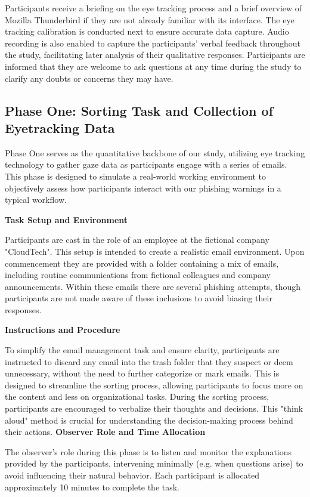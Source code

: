 \documentclass[
  a4paper,  %
  twoside,  %
  bibliography=totoc,
  headsepline,
  cleardoublepage=empty,
  parskip=half,
  draft=false
]{scrbook}
\begin{document}
Participants receive a briefing on the eye tracking process and a brief overview of Mozilla Thunderbird if they are not already familiar with its interface. The eye tracking calibration is conducted next to ensure accurate data capture. Audio recording is also enabled to capture the participants' verbal feedback throughout the study, facilitating later analysis of their qualitative responses. Participants are informed that they are welcome to ask questions at any time during the study to clarify any doubts or concerns they may have.

\subsection{Phase One: Sorting Task and Collection of Eyetracking Data}

Phase One serves as the quantitative backbone of our study, utilizing eye tracking technology to gather gaze data as participants engage with a series of emails. This phase is designed to simulate a real-world working environment to objectively assess how participants interact with our phishing warnings in a typical workflow. 

\textbf{Task Setup and Environment}

Participants are cast in the role of an employee at the fictional company "CloudTech". This setup is intended to create a realistic email environment. Upon commencement they are provided with a folder containing a mix of emails, including routine communications from fictional colleagues and company announcements. Within these emails there are several phishing attempts, though participants are not made aware of these inclusions to avoid biasing their responses.  

\textbf{Instructions and Procedure}

To simplify the email management task and ensure clarity, participants are instructed to discard any email into the trash folder that they suspect or deem unnecessary, without the need to further categorize or mark emails. This is designed to streamline the sorting process, allowing participants to focus more on the content and less on organizational tasks. 
During the sorting process, participants are encouraged to verbalize their thoughts and decisions. This "think aloud" method is crucial for understanding the decision-making process behind their actions.
\newpage
\textbf{Observer Role and Time Allocation}

The observer's role during this phase is to listen and monitor the explanations provided by the participants, intervening minimally (e.g. when questions arise) to avoid influencing their natural behavior. Each participant is allocated approximately 10 minutes to complete the task.
\end{document}
